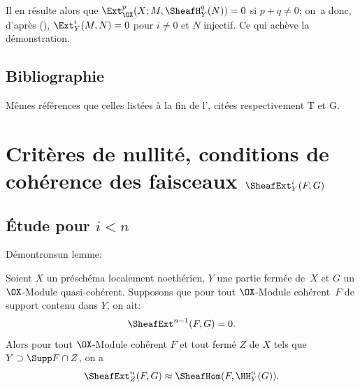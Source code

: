 Il en r\'esulte alors que $\Ext_{\OX}^p(X;M, \SheafH_Y^q(N))=0$ si $p+q \neq 0$; on~a donc, d'apr\`es (), $\Ext_Y^i(M, N)=0$ pour $i\neq 0$ et $N$ injectif. Ce qui ach\`eve la d\'emonstration.

\section*{Bibliographie} M\^emes r\'ef\'erences que celles list\'ees \`a la fin de l'\Exp {}, cit\'ees respectivement T et G.

\chapter[Crit\`eres de nullit\'e, conditions de coh\'erence]
{Crit\`eres de nullit\'e, conditions de coh\'erence des faisceaux $\SheafExt^{i}_{Y}(F, G)$}\label{VII}

\renewcommand{\theequation}{\thesection.\arabic{equation}}

\section{\'Etude pour $i < n$}

D\'emontrons\pageoriginale un lemme:

\begin{lemme} \label{VII.1.1}
Soient $X$ un pr\'esch\'ema localement noeth\'erien, $Y$ une partie ferm\'ee de~$X$ et $G$ un $\OX$-Module quasi-coh\'erent. Supposons que pour tout $\OX$-Module coh\'erent~$F$ de support contenu dans $Y$, on ait:
\[
\SheafExt^{n-1}(F, G) = 0.
\]
Alors pour tout $\OX$-Module coh\'erent $F$ et tout ferm\'e $Z$ de $X$ tels que $Y \supset \Supp F \cap Z$, on a
\[
\SheafExt^n_Z(F, G) \approx \SheafHom (F, \HH^n_Y(G)).
\]
\end{lemme}


